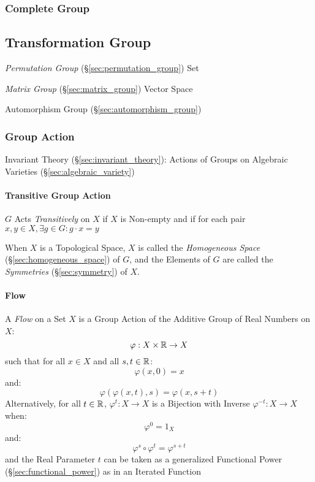 \subsubsection{Complete Group}\label{sec:complete_group}



\subsection{Transformation Group}\label{sec:transformation_group}

\emph{Permutation Group} (\S\ref{sec:permutation_group}) Set

\emph{Matrix Group} (\S\ref{sec:matrix_group}) Vector Space

Automorphism Group (\S\ref{sec:automorphism_group})



\subsubsection{Group Action}\label{sec:group_action}

Invariant Theory (\S\ref{sec:invariant_theory}): Actions of Groups on
Algebraic Varieties (\S\ref{sec:algebraic_variety})



\paragraph{Transitive Group Action}\label{sec:transitive_action}\hfill

$G$ Acts \emph{Transitively} on $X$ if $X$ is Non-empty and if for each pair
$x,y \in X, \exists g \in G : g \cdot x = y$

When $X$ is a Topological Space, $X$ is called the \emph{Homogeneous Space}
(\S\ref{sec:homogeneous_space}) of $G$, and the Elements of $G$ are called the
\emph{Symmetries} (\S\ref{sec:symmetry}) of $X$.



\paragraph{Flow}\label{sec:flow}\hfill

A \emph{Flow} on a Set $X$ is a Group Action of the Additive Group of Real
Numbers on $X$:
\[
  \varphi : X \times \mathbb{R} \rightarrow X
\]
such that for all $x \in X$ and all $s,t \in \mathbb{R}$:
\[
  \varphi(x,0) = x
\]
and:
\[
  \varphi(\varphi(x,t),s) = \varphi(x,s+t)
\]
Alternatively, for all $t \in \mathbb{R}$, $\varphi^t : X \rightarrow X$ is a
Bijection with Inverse $\varphi^{-t} : X \rightarrow X$ when:
\[
  \varphi^0 = 1_X
\]
and:
\[
  \varphi^s \circ \varphi^t = \varphi^{s + t}
\]
and the Real Parameter $t$ can be taken as a generalized Functional Power
(\S\ref{sec:functional_power}) as in an Iterated Function


